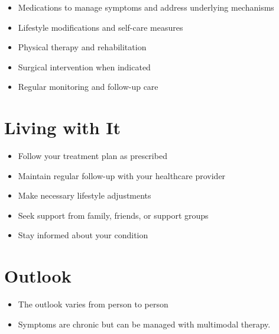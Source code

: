 \begin{itemize}[noitemsep]
  \item Medications to manage symptoms and address underlying mechanisms
  \item Lifestyle modifications and self-care measures
  \item Physical therapy and rehabilitation
  \item Surgical intervention when indicated
  \item Regular monitoring and follow-up care
\end{itemize}
\section{Living with It}
\begin{itemize}[noitemsep]
  \item Follow your treatment plan as prescribed
  \item Maintain regular follow-up with your healthcare provider
  \item Make necessary lifestyle adjustments
  \item Seek support from family, friends, or support groups
  \item Stay informed about your condition
\end{itemize}
\section{Outlook}
\begin{itemize}[noitemsep]
  \item The outlook varies from person to person
  \item Symptoms are chronic but can be managed with multimodal therapy.
\end{itemize}
